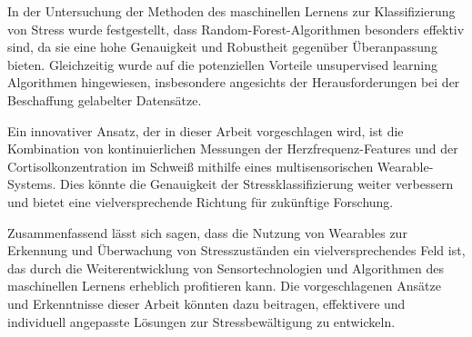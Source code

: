 In der Untersuchung der Methoden des maschinellen Lernens zur Klassifizierung von Stress wurde festgestellt, dass Random-Forest-Algorithmen besonders effektiv sind, da sie eine hohe Genauigkeit und Robustheit gegenüber Überanpassung bieten. Gleichzeitig wurde auf die potenziellen Vorteile unsupervised learning Algorithmen hingewiesen, insbesondere angesichts der Herausforderungen bei der Beschaffung gelabelter Datensätze.

Ein innovativer Ansatz, der in dieser Arbeit vorgeschlagen wird, ist die Kombination von kontinuierlichen Messungen der Herzfrequenz-Features und der Cortisolkonzentration im Schweiß mithilfe eines multisensorischen Wearable-Systems. Dies könnte die Genauigkeit der Stressklassifizierung weiter verbessern und bietet eine vielversprechende Richtung für zukünftige Forschung.

Zusammenfassend lässt sich sagen, dass die Nutzung von Wearables zur Erkennung und Überwachung von Stresszuständen ein vielversprechendes Feld ist, das durch die Weiterentwicklung von Sensortechnologien und Algorithmen des maschinellen Lernens erheblich profitieren kann. Die vorgeschlagenen Ansätze und Erkenntnisse dieser Arbeit könnten dazu beitragen, effektivere und individuell angepasste Lösungen zur Stressbewältigung zu entwickeln.
    
    
